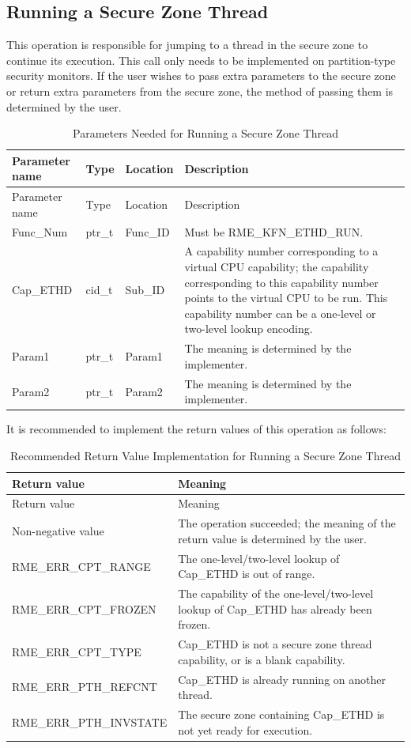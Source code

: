 \subsection{Running a Secure Zone Thread}\label{subsec:8-run-enclave-thread}

This operation is responsible for jumping to a thread in the secure zone to continue its execution. This call only needs to be implemented on partition-type security monitors. If the user wishes to pass extra parameters to the secure zone or return extra parameters from the secure zone, the method of passing them is determined by the user.

\begin{xltabular}{\textwidth}{@{}>{\hsize\raggedright\arraybackslash}X>{\hsize\raggedright\arraybackslash}X>{\hsize\raggedright\arraybackslash}X>{\hsize\raggedright\arraybackslash}X@{}}
\caption{Parameters Needed for Running a Secure Zone Thread}\label{tab:8-106-run-enclave-thread-parameters}\\
\toprule
Parameter name & Type & Location & Description\tabularnewline
\endfirsthead
\toprule
Parameter name & Type & Location & Description\tabularnewline
\midrule
\endhead
\bottomrule
\endlastfoot
Func\_Num & ptr\_t & Func\_ID &
Must be RME\_KFN\_ETHD\_RUN.\tabularnewline
Cap\_ETHD & cid\_t & Sub\_ID &
A capability number corresponding to a virtual CPU capability; the capability corresponding to this capability number points to the virtual CPU to be run. This capability number can be a one-level or two-level lookup encoding.\tabularnewline
Param1 & ptr\_t & Param1 & The meaning is determined by the implementer.\tabularnewline
Param2 & ptr\_t & Param2 & The meaning is determined by the implementer.\tabularnewline
\end{xltabular}
\nopagebreak[4]

It is recommended to implement the return values of this operation as follows:

\begin{xltabular}{\textwidth}{@{}>{\hsize\raggedright\arraybackslash}X>{\hsize\raggedright\arraybackslash}X@{}}
\caption{Recommended Return Value Implementation for Running a Secure Zone Thread}\label{tab:8-107-run-enclave-thread-suggested-return-values}\\
\toprule
Return value & Meaning\tabularnewline
\endfirsthead
\toprule
Return value & Meaning\tabularnewline
\midrule
\endhead
\bottomrule
\endlastfoot
    Non-negative value & The operation succeeded; the meaning of the return value is determined by the user.\tabularnewline
    RME\_ERR\_CPT\_RANGE & The one-level/two-level lookup of Cap\_ETHD is out of range.\tabularnewline
    RME\_ERR\_CPT\_FROZEN & The capability of the one-level/two-level lookup of Cap\_ETHD has already been frozen.\tabularnewline
    RME\_ERR\_CPT\_TYPE & Cap\_ETHD is not a secure zone thread capability, or is a blank capability.\tabularnewline
    RME\_ERR\_PTH\_REFCNT & Cap\_ETHD is already running on another thread.\tabularnewline
    RME\_ERR\_PTH\_INVSTATE & The secure zone containing Cap\_ETHD is not yet ready for execution.\tabularnewline
\end{xltabular}
\nopagebreak[4]

